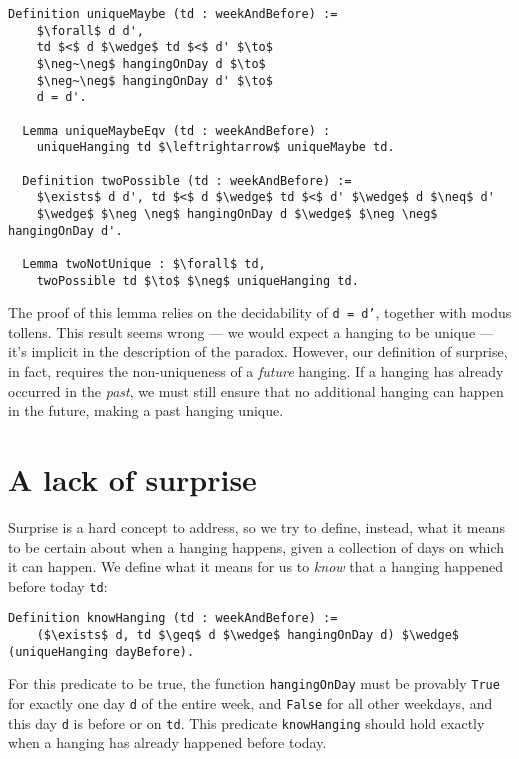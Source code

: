\documentclass[runningheads]{llncs}
\begin{document}
\begin{lstlisting}[mathescape=true]
  Definition uniqueMaybe (td : weekAndBefore) :=
    $\forall$ d d',
    td $<$ d $\wedge$ td $<$ d' $\to$
    $\neg~\neg$ hangingOnDay d $\to$
    $\neg~\neg$ hangingOnDay d' $\to$
    d = d'.

  Lemma uniqueMaybeEqv (td : weekAndBefore) :
    uniqueHanging td $\leftrightarrow$ uniqueMaybe td.

  Definition twoPossible (td : weekAndBefore) :=
    $\exists$ d d', td $<$ d $\wedge$ td $<$ d' $\wedge$ d $\neq$ d'
    $\wedge$ $\neg \neg$ hangingOnDay d $\wedge$ $\neg \neg$ hangingOnDay d'.

  Lemma twoNotUnique : $\forall$ td,
    twoPossible td $\to$ $\neg$ uniqueHanging td.
\end{lstlisting}

The proof of this lemma relies on the decidability of
{\tt d = d'}, together with modus tollens. This result seems wrong --- we would expect a hanging to be
unique --- it's implicit in the description of the paradox. However, our definition of
surprise, in fact, requires the non-uniqueness of a \emph{future} hanging. If a hanging
has already occurred in the \emph{past}, we must still ensure that no additional hanging
can happen in the future, making a past hanging unique.

\section{A lack of surprise}
\label{sec:lack}

Surprise is a hard concept to address, so we try to define, instead, what it means to be certain about
when a hanging happens, given a collection of days on which it can happen.
We define what it means for us to \emph{know} that a hanging happened before today {\tt td}:

\begin{lstlisting}[mathescape=true]
  Definition knowHanging (td : weekAndBefore) :=
    ($\exists$ d, td $\geq$ d $\wedge$ hangingOnDay d) $\wedge$ (uniqueHanging dayBefore).
\end{lstlisting}

For this predicate to be true, the function {\tt hangingOnDay} must be provably \texttt{True}
for exactly one day {\tt d} of the entire week, and {\tt False} for all other weekdays, and this day {\tt d} is
before or on {\tt td}.
This predicate {\tt knowHanging} should hold exactly when a hanging has already happened
before today.
\end{document}

